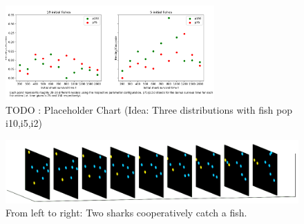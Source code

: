 \documentclass[letterpaper]{article}
\begin{document}
\begin{figure}[t]
\begin{center}
\includegraphics[width=8cm]{figures/Sterberisiko_vs_Herding_Two_Net_2.png}
\caption{TODO : Placeholder Chart (Idea: Three distributions with fish pop i10,i5,i2)}
\label{fig:herding}
\end{center}
\end{figure}

\begin{figure}[t]
\begin{center}
\includegraphics[width=\textwidth]{figures/coop_movie_frames2.png}
\caption{From left to right: Two sharks cooperatively catch a fish.}
\label{fig:coop_movie}
\end{center}
\end{figure}
\end{document}
